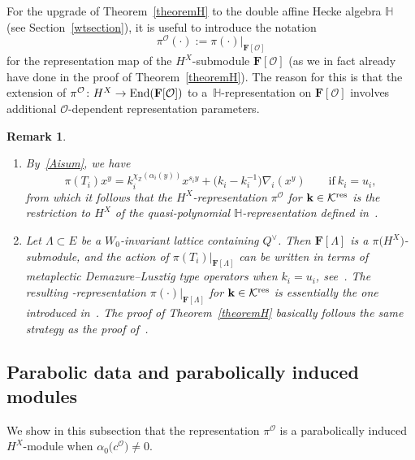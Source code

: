 \documentclass[pdftex]{sigma}
\numberwithin{equation}{section}
\newtheorem{Remark}[Theorem]{Remark} }
\begin{document}
 For the upgrade of Theorem~\ref{theoremH} to the double affine Hecke algebra $\mathbb{H}$ (see Section~\ref{wtsection}), it is useful to introduce the notation
 \begin{equation*}%
 \pi^\mathcal{O}(\cdot):=\pi(\cdot)\vert_{\mathbf{F}[\mathcal{O}]}
 \end{equation*}
 for the representation map of the $H^X$-submodule $\mathbf{F}[\mathcal{O}]$ (as we in fact already have done in the proof of Theorem~\ref{theoremH}). The reason for this is that the extension of $\pi^{\mathcal{O}}\colon H^X\rightarrow\textup{End}(\mathbf{F}[\mathcal{O}])$ to a~$\mathbb{H}$-representation on $\mathbf{F}[\mathcal{O}]$ involves additional $\mathcal{O}$-dependent representation parameters.

\begin{Remark}\quad
\begin{enumerate}\itemsep=0pt
\item
By~\eqref{Aisum}, we have
\begin{equation*}%
\pi(T_i)x^y=k_i^{\chi_{\mathbb{Z}}(\alpha_i(y))}x^{s_iy}+\bigl(k_i-k_i^{-1}\bigr)\nabla_i(x^y)\qquad
\text{if}\ k_i=u_i,
\end{equation*}
from which it follows that the $H^X$-representation $\pi^\mathcal{O}$ for $\mathbf{k}\in\mathcal{K}^{{\rm res}}$ is the restriction to $H^X$ of the quasi-polynomial $\mathbb{H}$-representation defined in~\cite[Theorem~1.1] {SSV2}.
\item Let $\Lambda\subset E$ be a $W_0$-invariant lattice containing $Q^\vee$. Then $\mathbf{F}[\Lambda]$ is a $\pi\bigl(H^X\bigr)$-submodule, and the action of $\pi(T_i)\vert_{\mathbf{F}[\Lambda]}$ can be written in terms of metaplectic Demazure--Lusztig type operators when $k_i=u_i$, see~\cite{SSV2}.
The resulting -representation $\pi(\cdot)\vert_{\mathbf{F}[\Lambda]}$ for $\mathbf{k}\in\mathcal{K}^{{\rm res}}$ is essentially the one introduced in~\cite[Theorem~3.7]{SSV1}. The proof of
 Theorem~\ref{theoremH} basically follows the same strategy as the proof of~\cite[Theorem~3.7]{SSV1}.
 \end{enumerate}
 \end{Remark}
\subsection{Parabolic data and parabolically induced modules}\label{section_pi_mod}
We show in this subsection that the representation $\pi^\mathcal{O}$ is a parabolically induced $H^X$-module when $\alpha_0\bigl(c^\mathcal{O}\bigr)\not=0$.
\end{document}
